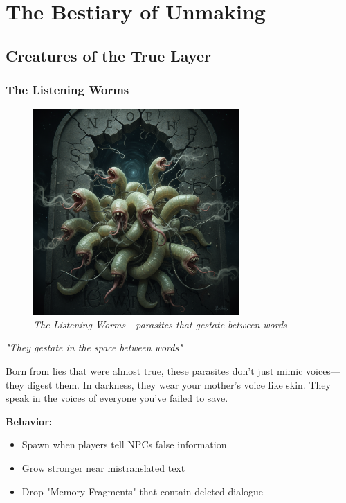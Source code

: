 \documentclass[11pt,a4paper,twoside]{book}
\begin{document}
\part{The Bestiary of Unmaking}

\chapter{Creatures of the True Layer}

\section{The Listening Worms}

\begin{figure}[h]
\centering
\includegraphics[width=0.7\textwidth]{images/listening_worms_2025-09-03T22-31-43-701Z_1.png}
\caption*{\textit{The Listening Worms - parasites that gestate between words}}
\end{figure}

\begin{tcolorbox}[horrorbox={Paraz'îth Vêl'thar}]
\textit{"They gestate in the space between words"}

Born from lies that were almost true, these parasites don't just mimic voices—they digest them. In darkness, they wear your mother's voice like skin. They speak in the voices of everyone you've failed to save.

\textbf{Behavior:}
\begin{itemize}
    \item Spawn when players tell NPCs false information
    \item Grow stronger near mistranslated text
    \item Drop "Memory Fragments" that contain deleted dialogue
\end{itemize}
\end{tcolorbox}
\end{document}
